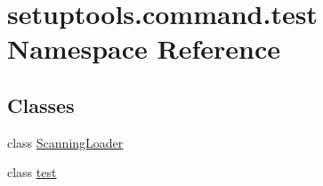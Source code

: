 \hypertarget{namespacesetuptools_1_1command_1_1test}{}\section{setuptools.\+command.\+test Namespace Reference}
\label{namespacesetuptools_1_1command_1_1test}
\subsection*{Classes}
\begin{DoxyCompactItemize}
\item 
class \hyperlink{classsetuptools_1_1command_1_1test_1_1ScanningLoader}{Scanning\+Loader}
\item 
class \hyperlink{classsetuptools_1_1command_1_1test_1_1test}{test}
\end{DoxyCompactItemize}
